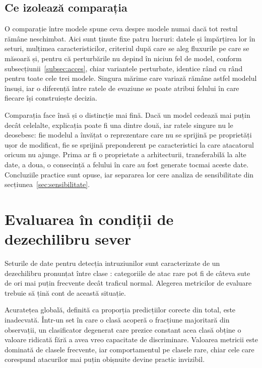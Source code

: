 \subsection{Ce izolează comparația}\label{subsec:comparatie}

O comparație între modele spune ceva despre modele numai dacă tot restul rămâne neschimbat. Aici sunt ținute fixe patru lucruri: datele și împărțirea lor în seturi, mulțimea caracteristicilor, criteriul după care se aleg fluxurile pe care se măsoară și, pentru că perturbările nu depind în niciun fel de model, conform subsecțiunii~\ref{subsec:acces}, chiar variantele perturbate, identice rând cu rând pentru toate cele trei modele. Singura mărime care variază rămâne astfel modelul însuși, iar o diferență între ratele de evaziune se poate atribui felului în care fiecare își construiește decizia.

Comparația face însă și o distincție mai fină. Dacă un model cedează mai puțin decât celelalte, explicația poate fi una dintre două, iar ratele singure nu le deosebesc: fie modelul a învățat o reprezentare care nu se sprijină pe proprietăți ușor de modificat, fie se sprijină preponderent pe caracteristici la care atacatorul oricum nu ajunge. Prima ar fi o proprietate a arhitecturii, transferabilă la alte date, a doua, o consecință a felului în care au fost generate tocmai aceste date. Concluziile practice sunt opuse, iar separarea lor cere analiza de sensibilitate din secțiunea~\ref{sec:sensibilitate}.

\section{Evaluarea în condiții de dezechilibru sever}\label{sec:metrici}

Seturile de date pentru detecția intruziunilor sunt caracterizate de un dezechilibru pronunțat între clase \cite{ring2019survey, moustafa2015unsw}: categoriile de atac rare pot fi de câteva sute de ori mai puțin frecvente decât traficul normal. Alegerea metricilor de evaluare trebuie să țină cont de această situație.

Acuratețea globală, definită ca proporția predicțiilor corecte din total, este inadecvată. Într-un set în care o clasă acoperă o fracțiune majoritară din observații, un clasificator degenerat care prezice constant acea clasă obține o valoare ridicată fără a avea vreo capacitate de discriminare. Valoarea metricii este dominată de clasele frecvente, iar comportamentul pe clasele rare, chiar cele care corespund atacurilor mai puțin obișnuite devine practic invizibil.

